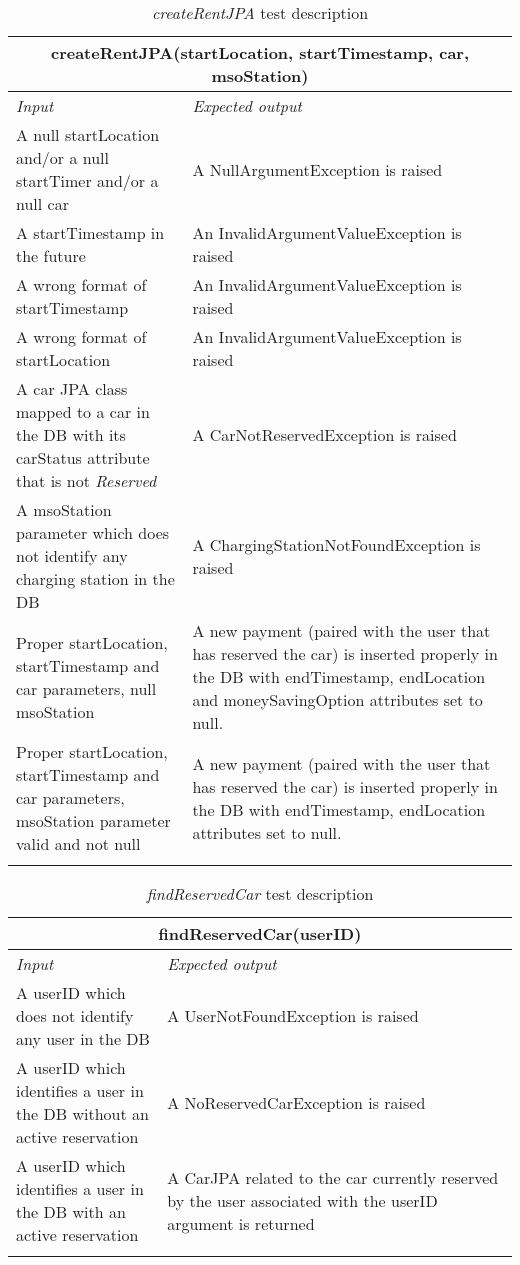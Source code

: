 \begin{longtable}{p{0.35\linewidth}p{0.65\linewidth}}
\multicolumn{2}{c}{\textbf{createRentJPA(startLocation, startTimestamp, car, msoStation)}} \\
\toprule
\emph{Input} & \emph{Expected output} \\
\midrule
A null startLocation and/or a null startTimer and/or a null car & A NullArgumentException is raised\\
\midrule
A startTimestamp in the future & An InvalidArgumentValueException is raised \\
\midrule
A wrong format of startTimestamp & An InvalidArgumentValueException is raised \\
\midrule
A wrong format of startLocation & An InvalidArgumentValueException is raised \\
\midrule
A car JPA class mapped to a car in the DB with its carStatus attribute that is not \emph{Reserved} & A CarNotReservedException is raised \\
\midrule
A msoStation parameter which does not identify any charging station in the DB & A ChargingStationNotFoundException is raised \\
\midrule
Proper startLocation, startTimestamp and car parameters, null msoStation & A new payment (paired with the user that has reserved the car) is inserted properly in the DB with endTimestamp, endLocation and moneySavingOption attributes set to null.\\
\midrule
Proper \mbox{startLocation}, startTimestamp and car parameters, \mbox{msoStation} parameter valid and not null & A new payment (paired with the user that has reserved the car) is inserted properly in the DB with endTimestamp, endLocation attributes set to null.\\
\bottomrule
\caption{\emph{createRentJPA} test description}
\end{longtable}

\begin{longtable}{p{0.3\linewidth}p{0.7\linewidth}}
\multicolumn{2}{c}{\textbf{findReservedCar(userID)}} \\
\toprule
\emph{Input} & \emph{Expected output} \\
\midrule
A userID which does not identify any user in the DB & A UserNotFoundException is raised\\
\midrule
A userID which identifies a user in the DB without an active reservation & A NoReservedCarException is raised \\
\midrule
A userID which identifies a user in the DB with an active reservation & A CarJPA related to the car currently reserved by the user associated with the userID argument is returned \\
\bottomrule
\caption{\label{tbl:findReservedCar}\emph{findReservedCar} test description}
\end{longtable}

